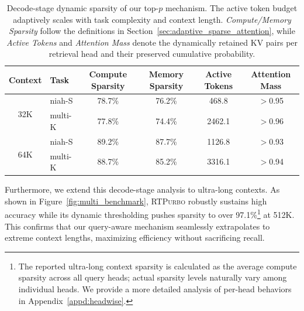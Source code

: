 \documentclass{llmxive}
\providecommand{\name}{{\textsc{RTPurbo}}\xspace}
\begin{document}
\begin{table}[t]
\centering
\small
\begin{tabular}{clcccc}
\toprule
\textbf{Context} & \textbf{Task} & \textbf{Compute Sparsity} & \textbf{Memory Sparsity} & \textbf{Active Tokens} & \textbf{Attention Mass} \\
\midrule
\multirow{2}{*}{32K} & niah-S & 78.7\% & 76.2\% & 468.8 & $>$0.95 \\
                     & multi-K & 77.8\% & 74.4\% & 2462.1 & $>$0.96 \\
\midrule
\multirow{2}{*}{64K} & niah-S & 89.2\% & 87.7\% & 1126.8 & $>$0.93 \\
                     & multi-K  & 88.7\% & 85.2\% & 3316.1 & $>$0.94 \\
\bottomrule
\end{tabular}
\caption{Decode-stage dynamic sparsity of our top-$p$ mechanism. The active token budget adaptively scales with task complexity and context length. \textit{Compute/Memory Sparsity} follow the definitions in Section~\ref{sec:adaptive_sparse_attention}, while \textit{Active Tokens} and \textit{Attention Mass} denote the dynamically retained KV pairs per retrieval head and their preserved cumulative probability.}
\label{tab:dynamic_sparsity}
\end{table}

Furthermore, we extend this decode-stage analysis to ultra-long contexts. As shown in Figure~\ref{fig:multi_benchmark}, \name robustly sustains high accuracy while its dynamic thresholding pushes sparsity to over 97.1\%\footnote{The reported ultra-long context sparsity is calculated as the average compute sparsity across all query heads; actual sparsity levels naturally vary among individual heads. We provide a more detailed analysis of per-head behaviors in Appendix~\ref{appd:headwise}.} at 512K. This confirms that our query-aware mechanism seamlessly extrapolates to extreme context lengths, maximizing efficiency without sacrificing recall. 

\end{document}
